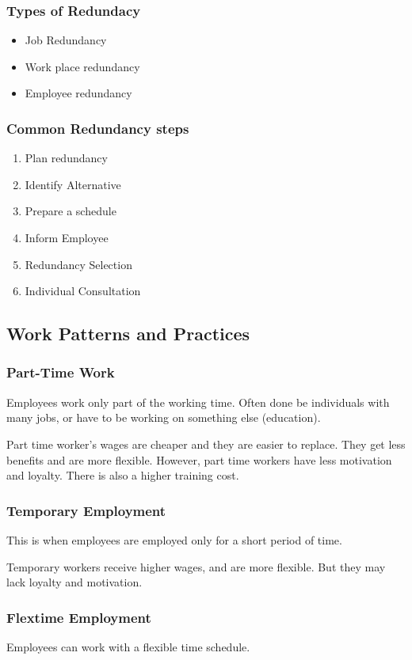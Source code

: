 \documentclass{standalone}
\begin{document}
\subsubsection{Types of Redundacy}
\begin{itemize}
	\item Job Redundancy
	\item Work place redundancy
	\item Employee redundancy
\end{itemize}

\subsubsection{Common Redundancy steps}
\begin{enumerate}
	\item Plan redundancy
	\item Identify Alternative
	\item Prepare a schedule
	\item Inform Employee
	\item Redundancy Selection
	\item Individual Consultation
\end{enumerate}

\subsection{Work Patterns and Practices}
\subsubsection{Part-Time Work}
Employees work only part of the working time.
Often done be individuals with many jobs, or have to be working on something else (education).

Part time worker's wages are cheaper and they are easier to replace.
They get less benefits and are more flexible.
However, part time workers have less motivation and loyalty.
There is also a higher training cost.

\subsubsection{Temporary Employment}
This is when employees are employed only for a short period of time.

Temporary workers receive higher wages, and are more flexible.
But they may lack loyalty and motivation.

\subsubsection{Flextime Employment}
Employees can work with a flexible time schedule.
\end{document}
